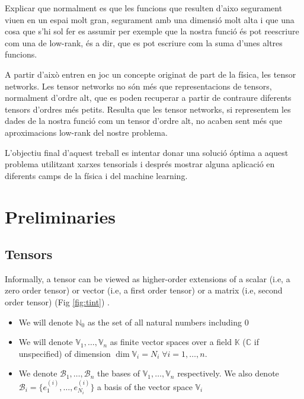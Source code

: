 \documentclass[11pt,a4paper,openright,oneside]{book}
\numberwithin{equation}{section}
\begin{document}
Explicar que normalment es que les funcions que resulten d'aixo segurament viuen en un espai molt gran, segurament
amb una dimensió molt alta i que una cosa
que s'hi sol fer es assumir per exemple que la nostra funció és pot reescriure com una de low-rank, és a dir, que es pot escriure com la suma
d'unes altres funcions.

A partir d'això entren en joc un concepte originat de part de la física, les tensor networks. Les tensor networks no són més
que representacions de tensors, normalment d'ordre alt, que es poden recuperar a partir de contraure diferents tensors d'ordres més
petits. Resulta que les tensor networks, si representem les dades de la nostra funció com un tensor d'ordre alt, no acaben sent més que
aproximacions low-rank del nostre problema.

L'objectiu final d'aquest treball es intentar donar una solució óptima a aquest problema utilitzant xarxes tensorials i després mostrar
alguna aplicació en diferents camps de la física i del machine learning.

\newpage

\chapter{Preliminaries}

\section{Tensors}

Informally, a tensor can be viewed as higher-order extensions of a scalar (i.e, a zero order tensor) or vector (i.e, a first order tensor) 
or a matrix (i.e, second order tensor) (Fig \ref{fig:tint}) \cite{yokotaVeryBasicsTensors2024}.

\begin{itemize}
    \item We will denote $\mathbb{N}_0$ as the set of all natural numbers including $0$
    \item We will denote $\mathbb{V}_1, \dots, \mathbb{V}_n$ as finite vector spaces over a field $\mathbb{K}$ ($\mathbb{C}$ if unspecified) of dimension $\dim{\mathbb{V}_i} = N_i \; \forall i = 1, \dots, n$.
    \item We denote $\mathcal{B}_1, \dots, \mathcal{B}_n$ the bases of $\mathbb{V}_1, \dots, \mathbb{V}_n$ respectively. We also denote
        ${\mathcal{B}_i = \{e_1^{(i)}, \dots, e_{N_i}^{(i)}\}}$ a basis of the vector space $\mathbb{V}_i$
\end{itemize}
\end{document}
